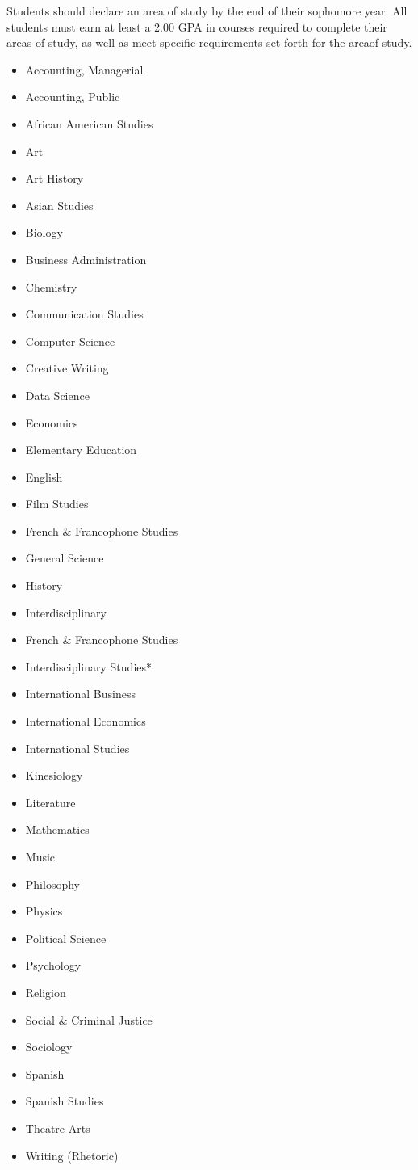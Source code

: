 \documentclass[
  letterpaper,
]{scrbook}
\providecommand{\tightlist}{%
  \setlength{\itemsep}{0pt}\setlength{\parskip}{0pt}}
\begin{document}
Students should declare an area of study by the end of their sophomore
year. All students must earn at least a 2.00 GPA in courses required to
complete their areas of study, as well as meet specific requirements set
forth for the areaof study.

\begin{itemize}
\tightlist
\item
  Accounting, Managerial
\item
  Accounting, Public
\item
  African American Studies
\item
  Art
\item
  Art History
\item
  Asian Studies
\item
  Biology
\item
  Business Administration
\item
  Chemistry
\item
  Communication Studies
\item
  Computer Science
\item
  Creative Writing
\item
  Data Science
\item
  Economics
\item
  Elementary Education
\item
  English
\item
  Film Studies
\item
  French \& Francophone Studies
\item
  General Science
\item
  History
\item
  Interdisciplinary
\end{itemize}

\begin{itemize}
\tightlist
\item
  French \& Francophone Studies
\item
  Interdisciplinary Studies*
\item
  International Business
\item
  International Economics
\item
  International Studies
\item
  Kinesiology
\item
  Literature
\item
  Mathematics
\item
  Music
\item
  Philosophy
\item
  Physics
\item
  Political Science
\item
  Psychology
\item
  Religion
\item
  Social \& Criminal Justice
\item
  Sociology
\item
  Spanish
\item
  Spanish Studies
\item
  Theatre Arts
\item
  Writing (Rhetoric)
\end{itemize}
\end{document}
